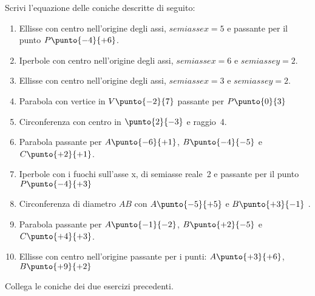 \begin{esercizio}\label{ese:03.1}
Scrivi l'equazione delle coniche descritte di seguito:
 \begin{enumerate} [nosep]
  \item  Ellisse con centro nell'origine degli assi, 
 \(semiassex=5\) e passante per il punto \(P\punto{-4}{+6}\).
  \item  Iperbole con centro nell'origine degli assi, 
  \(semiassex=6\) e \(semiassey=2\).
  \item  Ellisse con centro nell'origine degli assi, 
  \(semiassex=3\) e \(semiassey=2\).
  \item  Parabola con vertice in \(V\punto{-2}{7}\) 
  passante per \(P\punto{0}{3}\)
  \item  Circonferenza con centro in \(\punto{2}{-3}\) e raggio~4.
  \item  Parabola passante per \(A\punto{-6}{+1}\), \(B\punto{-4}{-5}\) e 
  \(C\punto{+2}{+1}\).
  \item  Iperbole con i fuochi sull'asse x, di semiasse reale~2 e
  passante per il punto \(P\punto{-4}{+3}\)
  \item  Circonferenza di diametro \(AB\) con
  \(A\punto{-5}{+5}\) e \(B\punto{+3}{-1}\) .
  \item  Parabola passante per \(A\punto{-1}{-2}\), \(B\punto{+2}{-5}\) e 
  \(C\punto{+4}{+3}\).
  \item  Ellisse con centro nell'origine passante per i punti:
  \(A\punto{+3}{+6}\), \(B\punto{+9}{+2}\)
 \end{enumerate}
\end{esercizio}

\begin{esercizio}\label{ese:03.1}
Collega le coniche dei due esercizi precedenti.
\end{esercizio}

